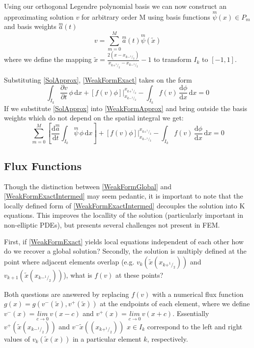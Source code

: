 \documentclass[letterpaper]{article}
\begin{document}
Using our orthogonal Legendre polynomial basis we can now construct an approximating solution $v$ for arbitrary order M using basis functions $\overset{m}{\psi}(x) \in P_m$ and basis weights $\overset{m}{a}(t)$
	\begin{equation}\label{SolApprox}
	v = \sum_{m=0}^M \overset{m}{a}(t)\overset{m}{\psi}(\tilde{x})
	\end{equation}
where we define the mapping $\tilde{x} = \frac{2(x-x_{k-^1\!/_2})}{x_{k+^1\!/_2}-x_{k-^1\!/_2}}-1$ to transform $I_k$ to $[-1,1]$.

Substituting \eqref{SolApprox}, \eqref{WeakFormExact} takes on the form
	\begin{equation}\label{WeakFormApprox}
	\int_{I_k}\! \frac{\partial v}{\partial t} \,\phi \,\mathrm{d}x +
	[f(v)\phi] \Big\rvert_{x_{k-^1\!/_2}}^{x_{k+^1\!/_2}} -
	\int_{I_k}\! f(v) \,\frac{\mathrm{d} \phi}{\mathrm{d} x} \,\mathrm{d}x = 0
	\end{equation}
If we substitute \eqref{SolApprox} into \eqref{WeakFormApprox} and bring outside the basis weights which do not depend on the spatial integral we get:
	\begin{equation}\label{WeakFormApproxIntermed}
	\sum_{m=0}^M \left[ \frac{\mathrm{d}\overset{m}{a}}{\mathrm{d} t} \int_{I_k}\! \overset{m}{\psi} \,\phi \,\mathrm{d}x \right] + 
	[f(v)\phi] \Big\rvert_{x_{k-^1\!/_2}}^{x_{k+^1\!/_2}} -
	 \int_{I_k}\! f(v) \,\frac{\mathrm{d} \phi}{\mathrm{d} x} \,\mathrm{d}x = 0
	\end{equation}

\subsection{Flux Functions}
Though the distinction between \eqref{WeakFormGlobal} and \eqref{WeakFormExactIntermed} may seem pedantic, it is important to note that the locally defined form of \eqref{WeakFormExactIntermed} decouples the solution into K equations. This improves the locallity of the solution (particularly important in non-elliptic PDEs), but presents several challenges not present in FEM.

First, if \eqref{WeakFormExact} yields local equations independent of each other how do we recover a global solution? Secondly, the solution is multiply defined at the point where adjacent elements overlap (e.g. $v_k(\tilde{x}(x_{k+^1\!/_2}))$ and $v_{k+1}(\tilde{x}(x_{k-^1\!/_2}))$\;), what is $f(v)$ at these points?

Both questions are answered by replacing $f(v)$ with a numerical flux function $g(x) = g(v^-(\tilde{x}),v^+(\tilde{x}))$ at the endpoints of each element, where we define $v^-(x) = \underset{c \to 0}{lim} \,v(x-c)$ and $v^+(x) = \underset{c \to 0}{lim} \,v(x+c)$. Essentially $v^+(\tilde{x}(x_{k-^1\!/_2}))$ and $v^-\tilde{x}((x_{k+^1\!/_2}))$ $x \in I_k$ correspond to the left and right values of $v_k(\tilde{x}(x))$ in a particular element $k$, respectively.
\end{document}
